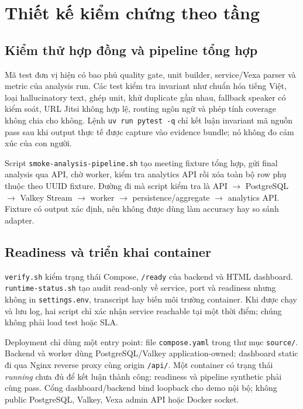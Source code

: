 \section{Thiết kế kiểm chứng theo tầng}

\subsection{Kiểm thử hợp đồng và pipeline tổng hợp}

Mã test đơn vị hiện có bao phủ quality gate, unit builder, service/Vexa parser và metric của analysis run. Các test kiểm tra invariant như chuẩn hóa tiếng Việt, loại hallucinatory text, ghép unit, khử duplicate gần nhau, fallback speaker có kiểm soát, URL Jitsi không hợp lệ, routing ngôn ngữ và phép tính coverage không chia cho không. Lệnh \texttt{uv run pytest -q} chỉ kết luận invariant mã nguồn pass sau khi output thực tế được capture vào evidence bundle; nó không đo cảm xúc của con người.

Script \texttt{smoke-analysis-pipeline.sh} tạo meeting fixture tổng hợp, gửi final analysis qua API, chờ worker, kiểm tra analytics API rồi xóa toàn bộ row phụ thuộc theo UUID fixture. Đường đi mà script kiểm tra là API $\rightarrow$ PostgreSQL $\rightarrow$ Valkey Stream $\rightarrow$ worker $\rightarrow$ persistence/aggregate $\rightarrow$ analytics API. Fixture có output xác định, nên không được dùng làm accuracy hay so sánh adapter.

\subsection{Readiness và triển khai container}

\texttt{verify.sh} kiểm trạng thái Compose, \texttt{/ready} của backend và HTML dashboard. \texttt{runtime-status.sh} tạo audit read-only về service, port và readiness nhưng không in \texttt{settings.env}, transcript hay biến môi trường container. Khi được chạy và lưu log, hai script chỉ xác nhận service reachable tại một thời điểm; chúng không phải load test hoặc SLA.

Deployment chỉ dùng một entry point: file \texttt{compose.yaml} trong thư mục \texttt{source/}. Backend và worker dùng PostgreSQL/Valkey application-owned; dashboard static đi qua Nginx reverse proxy cùng origin \texttt{/api/}. Một container có trạng thái \emph{running} chưa đủ để kết luận thành công: readiness và pipeline synthetic phải cùng pass. Cổng dashboard/backend bind loopback cho demo nội bộ; không public PostgreSQL, Valkey, Vexa admin API hoặc Docker socket.

